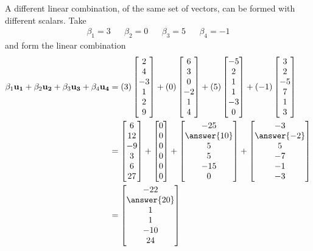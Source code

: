 \documentclass{ximera}
\begin{document}
\begin{example}
  A different linear combination, of the same set of vectors, can be
  formed with different scalars. Take
  \begin{align*}
    \beta_1=3&&\beta_2=0&&\beta_3=5&&\beta_4=-1
  \end{align*}
  and form the linear combination
  \begin{align*}
    \beta_1\vect{u_1}+ \beta_2\vect{u_2}+ \beta_3\vect{u_3}+ \beta_4\vect{u_4}
    &=
      (3)\colvector{2\\4\\-3\\1\\2\\9}+
      (0)\colvector{6\\3\\0\\-2\\1\\4}+
      (5)\colvector{-5\\2\\1\\1\\-3\\0}+
      (-1)\colvector{3\\2\\-5\\7\\1\\3}\\
    &=
      \colvector{6\\12\\-9\\3\\6\\27}+
      \colvector{0\\0\\0\\0\\0\\0}+
      \colvector{-25\\\answer{10}\\5\\5\\-15\\0}+
      \colvector{-3\\\answer{-2}\\5\\-7\\-1\\-3} \\
    &=
      \colvector{-22\\\answer{20}\\1\\1\\-10\\24}

\end{align*}
\end{example}
\end{document}
